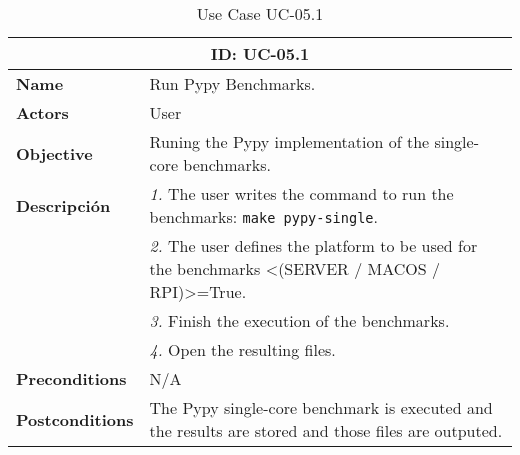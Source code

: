 \begin{table}[H]
    \centering
    \begin{tabular}{l p{10cm}}
        \toprule
        \multicolumn{2}{c}{\textbf{ID: UC-05.1}} \\
        \toprule
        \textbf{Name}                         &  Run Pypy Benchmarks. \\
        \textbf{Actors}                       &  User \\
        \textbf{Objective}                    &  Runing the Pypy implementation of the single-core benchmarks. \\
        \multirow{1}{*}{\textbf{Descripción}} & \textsl{1.} The user writes the command to run the benchmarks: \texttt{make pypy-single}.\\
                                              & \textsl{2.} The user defines the platform to be used for the benchmarks <(SERVER / MACOS / RPI)>=True.\\
                                              & \textsl{3.} Finish the execution of the benchmarks.\\
                                              & \textsl{4.} Open the resulting files.\\ 
        \textbf{Preconditions}                &  N/A \\
        \textbf{Postconditions}               &  The Pypy single-core benchmark is executed and the results are stored and those files are outputed. \\
    \end{tabular}
    \caption{Use Case UC-05.1}
    \label{tab:uc-05.1}
\end{table}

